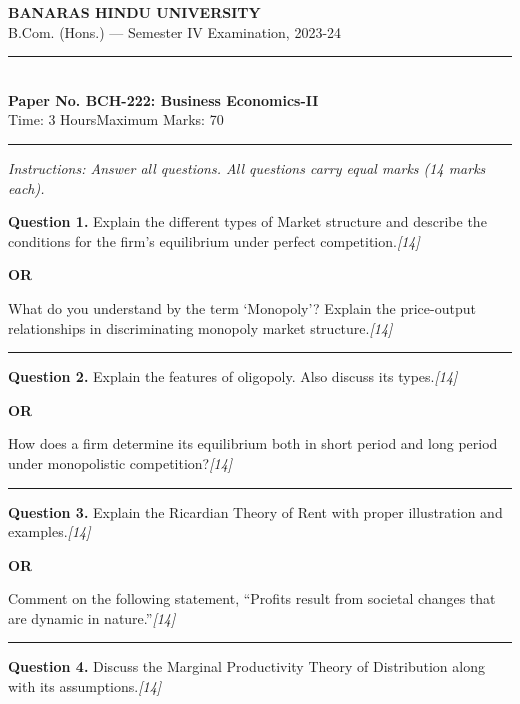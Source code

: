 \documentclass[11pt,a4paper]{article}
\newcommand{\pts}[1]{\hfill   \textit{[#1]}}
\begin{document}
\begin{center}
  {\large\bfseries BANARAS HINDU UNIVERSITY}\\[2pt]
  {\normalsize B.Com. (Hons.) --- Semester IV Examination, 2023-24}\\[6pt]
  \rule{0.8\linewidth}{0.5pt}\\[6pt]
  {\large\bfseries Paper No. BCH-222: Business Economics-II}\\[4pt]
  {\normalsize Time: 3 Hours\hfill Maximum Marks: 70}
\end{center}

\rule{\linewidth}{0.4pt}

\smallskip



\noindent   \textit{Instructions: Answer all questions. All questions carry equal marks (14 marks each).}

\bigskip




\noindent   \textbf{Question 1.}
Explain the different types of Market structure and describe the conditions for the firm's equilibrium under perfect competition.\pts{14}

\centerline{   \textbf{OR}}

What do you understand by the term `Monopoly'? Explain the price-output relationships in discriminating monopoly market structure.\pts{14}

\medskip\rule{\linewidth}{0.2pt}




\noindent   \textbf{Question 2.}
Explain the features of oligopoly. Also discuss its types.\pts{14}

\centerline{   \textbf{OR}}

How does a firm determine its equilibrium both in short period and long period under monopolistic competition?\pts{14}

\medskip\rule{\linewidth}{0.2pt}




\noindent   \textbf{Question 3.}
Explain the Ricardian Theory of Rent with proper illustration and examples.\pts{14}

\centerline{   \textbf{OR}}

Comment on the following statement, ``Profits result from societal changes that are dynamic in nature.''\pts{14}

\medskip\rule{\linewidth}{0.2pt}




\noindent   \textbf{Question 4.}
Discuss the Marginal Productivity Theory of Distribution along with its assumptions.\pts{14}
\end{document}
